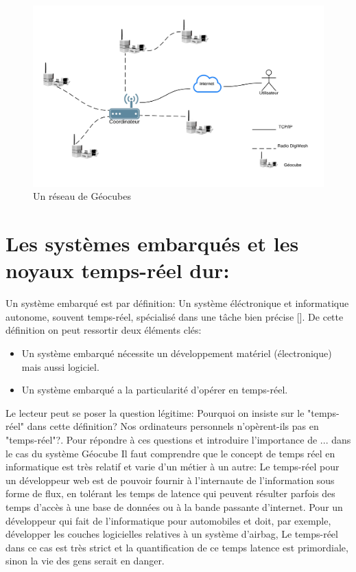 \documentclass{themeensg}
\begin{document}
\begin{figure}[h!]
\centering
\includegraphics[scale=0.8]{images/fig1.png}
\caption{Un réseau de Géocubes}
\label{fig:geocube_network}
\end{figure}

\section{Les systèmes embarqués et les noyaux temps-réel dur:}
Un système embarqué est par définition: Un système éléctronique et informatique autonome, souvent temps-réel, spécialisé dans une tâche bien précise []. De cette définition on peut ressortir deux éléments clés:
\begin{itemize}
\item Un système embarqué nécessite un développement matériel (électronique) mais aussi logiciel.
\item Un système embarqué a la particularité d'opérer en temps-réel.
\end{itemize}
Le lecteur peut se poser la question légitime: Pourquoi on insiste sur le "temps-réel" dans cette définition? Nos ordinateurs personnels n'opèrent-ils pas en "temps-réel"?. Pour répondre à ces questions et introduire l'importance de ... dans le cas du système Géocube Il faut comprendre que le concept de temps réel en informatique est très relatif et varie d'un métier à un autre: Le temps-réel pour un développeur web est de pouvoir fournir à l'internaute de l'information sous forme de flux, en tolérant les temps de latence qui peuvent résulter parfois des temps d'accès à une base de données ou à la bande passante d'internet. Pour un développeur qui fait de l'informatique pour automobiles et doit, par exemple, développer les couches logicielles relatives à un système d'airbag, Le temps-réel dans ce cas est très strict et la quantification de ce temps latence est primordiale, sinon la vie des gens serait en danger.
\end{document}
